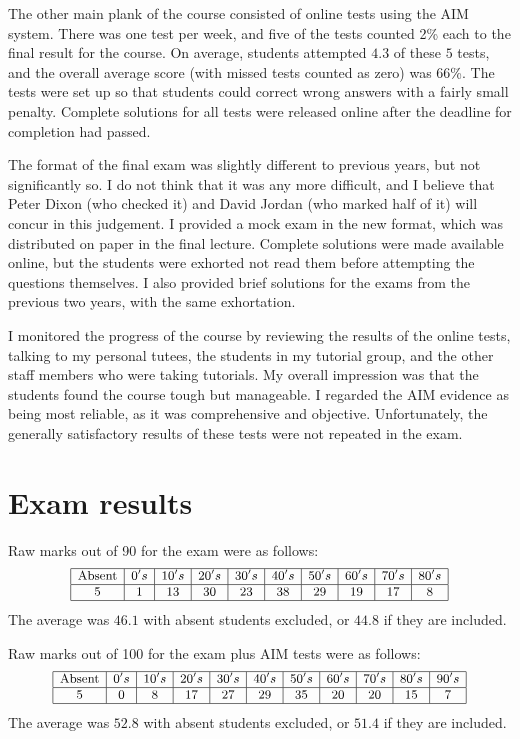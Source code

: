\documentclass{amsart}
\begin{document}
The other main plank of the course consisted of online tests using the
AIM system.  There was one test per week, and five of the tests
counted 2\% each to the final result for the course.  On average,
students attempted $4.3$ of these $5$ tests, and the overall average
score (with missed tests counted as zero) was 66\%.  The tests were
set up so that students could correct wrong answers with a fairly
small penalty.  Complete solutions for all tests were released online
after the deadline for completion had passed.

The format of the final exam was slightly different to previous years,
but not significantly so.  I do not think that it was any more
difficult, and I believe that Peter Dixon (who checked it) and David
Jordan (who marked half of it) will concur in this judgement.  I
provided a mock exam in the new format, which was distributed on paper
in the final lecture.  Complete solutions were made available online,
but the students were exhorted not read them before attempting the
questions themselves.  I also provided brief solutions for the exams
from the previous two years, with the same exhortation.

I monitored the progress of the course by reviewing the results of the
online tests, talking to my personal tutees, the students in my
tutorial group, and the other staff members who were taking tutorials.
My overall impression was that the students found the course tough but
manageable.  I regarded the AIM evidence as being most reliable, as it
was comprehensive and objective.  Unfortunately, the generally
satisfactory results of these tests were not repeated in the exam.

\section*{Exam results}

Raw marks out of 90 for the exam were as follows:
\[ \small \begin{array}{|c|c|c|c|c|c|c|c|c|c|}
    \hline
    \text{Absent} & 0's & 10's & 20's & 30's & 40's &
     50's & 60's & 70's & 80's \\
    \hline
     5 & 1 & 13 & 30 & 23 & 38 & 29 & 19 & 17 & 8 \\
    \hline
   \end{array}
\]
The average was $46.1$ with absent students excluded, or $44.8$ if
they are included.

Raw marks out of 100 for the exam plus AIM tests were as follows:
\[ \small \begin{array}{|c|c|c|c|c|c|c|c|c|c|c|}
    \hline
    \text{Absent} & 0's & 10's & 20's & 30's & 40's &
     50's & 60's & 70's & 80's & 90's \\
    \hline
     5 & 0 & 8 & 17 & 27 & 29 & 35 & 20 & 20 & 15 & 7 \\
    \hline
   \end{array}
\]
The average was $52.8$ with absent students excluded, or $51.4$ if
they are included.
\end{document}
